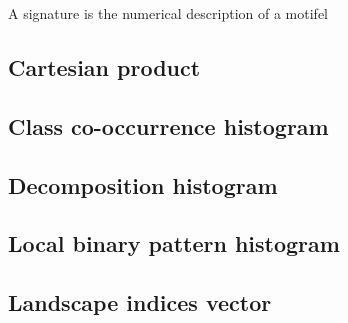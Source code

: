A signature is the numerical description of a motifel \label{signatures}

\subsection{Cartesian product}

\subsection{Class co-occurrence histogram}

\subsection{Decomposition histogram}

\subsection{Local binary pattern histogram}

\subsection{Landscape indices vector}
